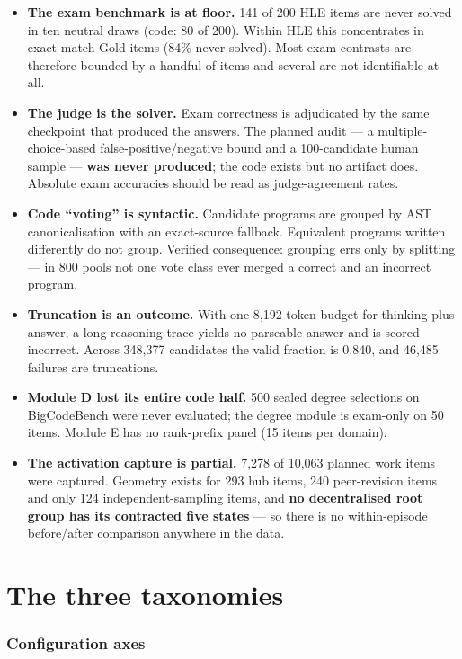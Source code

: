 \documentclass[10pt,a4paper]{article}
\begin{document}
\begin{itemize}
\item \textbf{The exam benchmark is at floor.} 141 of 200 HLE items are never solved in ten neutral draws (code: 80 of 200). Within HLE this concentrates in exact-match Gold items (84\% never solved). Most exam contrasts are therefore bounded by a handful of items and several are not identifiable at all.
\item \textbf{The judge is the solver.} Exam correctness is adjudicated by the same checkpoint that produced the answers. The planned audit --- a multiple-choice-based false-positive/negative bound and a 100-candidate human sample --- \textbf{was never produced}; the code exists but no artifact does. Absolute exam accuracies should be read as judge-agreement rates.
\item \textbf{Code ``voting'' is syntactic.} Candidate programs are grouped by AST canonicalisation with an exact-source fallback. Equivalent programs written differently do not group. Verified consequence: grouping errs only by splitting --- in 800 pools not one vote class ever merged a correct and an incorrect program.
\item \textbf{Truncation is an outcome.} With one 8{,}192-token budget for thinking plus answer, a long reasoning trace yields no parseable answer and is scored incorrect. Across 348{,}377 candidates the valid fraction is 0.840, and 46{,}485 failures are truncations.
\item \textbf{Module D lost its entire code half.} 500 sealed degree selections on BigCodeBench were never evaluated; the degree module is exam-only on 50 items. Module E has no rank-prefix panel (15 items per domain).
\item \textbf{The activation capture is partial.} 7{,}278 of 10{,}063 planned work items were captured. Geometry exists for 293 hub items, 240 peer-revision items and only 124 independent-sampling items, and \textbf{no decentralised root group has its contracted five states} --- so there is no within-episode before/after comparison anywhere in the data.
\end{itemize}

\part{The three taxonomies}\label{part:tax}

\section{Configuration axes}\label{sec:config}
\end{document}
